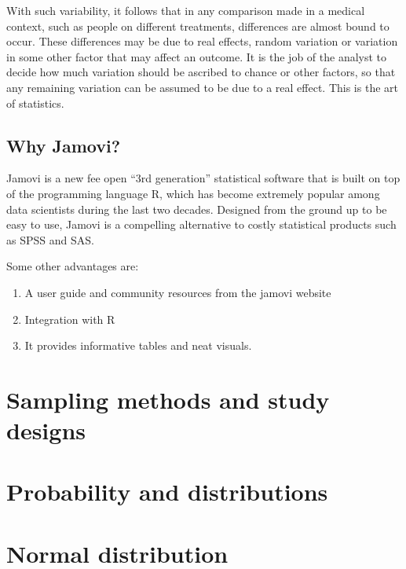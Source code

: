 \documentclass[
  16pt,
  letterpaper,
]{scrbook}
\begin{document}
With such variability, it follows that in any comparison made in a
medical context, such as people on different treatments, differences are
almost bound to occur. These differences may be due to real effects,
random variation or variation in some other factor that may affect an
outcome. It is the job of the analyst to decide how much variation
should be ascribed to chance or other factors, so that any remaining
variation can be assumed to be due to a real effect. This is the art of
statistics.

\hypertarget{why-jamovi}{%
\section{Why Jamovi?}\label{why-jamovi}}

Jamovi is a new fee open ``3rd generation'' statistical software that is
built on top of the programming language R, which has become extremely
popular among data scientists during the last two decades. Designed from
the ground up to be easy to use, Jamovi is a compelling alternative to
costly statistical products such as SPSS and SAS.

Some other advantages are:

\begin{enumerate}
\def\labelenumi{\arabic{enumi}.}
\item
  A user guide and community resources from the jamovi website
\item
  Integration with R
\item
  It provides informative tables and neat visuals.
\end{enumerate}


\hypertarget{sampling-methods-and-study-designs}{%
\chapter{Sampling methods and study
designs}\label{sampling-methods-and-study-designs}}


\hypertarget{probability-and-distributions}{%
\chapter{Probability and
distributions}\label{probability-and-distributions}}


\hypertarget{normal-distribution}{%
\chapter{Normal distribution}\label{normal-distribution}}
\end{document}
